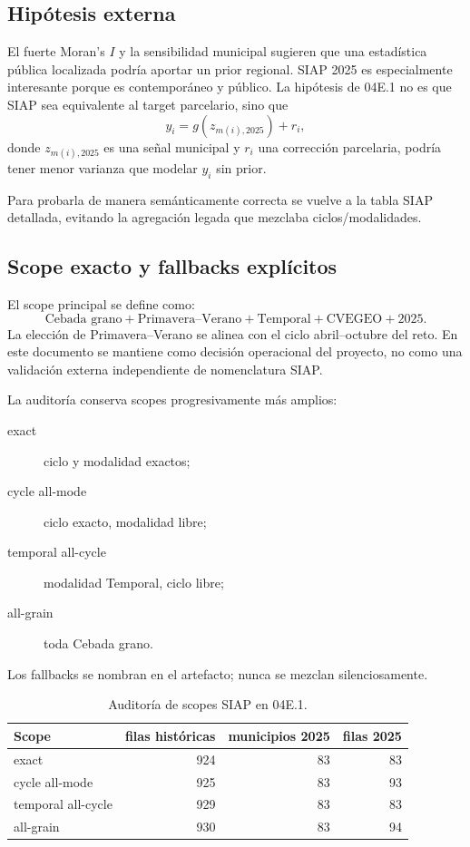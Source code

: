 \subsection{Hipótesis externa}

El fuerte Moran's $I$ y la sensibilidad municipal sugieren que una estadística pública
localizada podría aportar un prior regional. SIAP 2025 es especialmente interesante porque es
contemporáneo y público. La hipótesis de 04E.1 no es que SIAP sea equivalente al target
parcelario, sino que
\[
y_i = g(z_{m(i),2025}) + r_i,
\]
donde $z_{m(i),2025}$ es una señal municipal y $r_i$ una corrección parcelaria, podría tener
menor varianza que modelar $y_i$ sin prior.

Para probarla de manera semánticamente correcta se vuelve a la tabla SIAP detallada, evitando
la agregación legada que mezclaba ciclos/modalidades.

\subsection{Scope exacto y fallbacks explícitos}

El scope principal se define como:
\[
\text{Cebada grano}
+\text{Primavera--Verano}
+\text{Temporal}
+\text{CVEGEO}
+\text{2025}.
\]
La elección de Primavera--Verano se alinea con el ciclo abril--octubre del reto. En este
documento se mantiene como decisión operacional del proyecto, no como una validación externa
independiente de nomenclatura SIAP.

La auditoría conserva scopes progresivamente más amplios:
\begin{description}
\item[exact] ciclo y modalidad exactos;
\item[cycle all-mode] ciclo exacto, modalidad libre;
\item[temporal all-cycle] modalidad Temporal, ciclo libre;
\item[all-grain] toda Cebada grano.
\end{description}
Los fallbacks se nombran en el artefacto; nunca se mezclan silenciosamente.

\begin{table}[H]
\centering
\caption{Auditoría de scopes SIAP en 04E.1.}
\label{tab:cp04e-scope}
\begin{tabular}{lrrr}
\toprule
Scope & filas históricas & municipios 2025 & filas 2025 \\
\midrule
exact & 924 & 83 & 83 \\
cycle all-mode & 925 & 83 & 93 \\
temporal all-cycle & 929 & 83 & 83 \\
all-grain & 930 & 83 & 94 \\
\bottomrule
\end{tabular}
\end{table}

